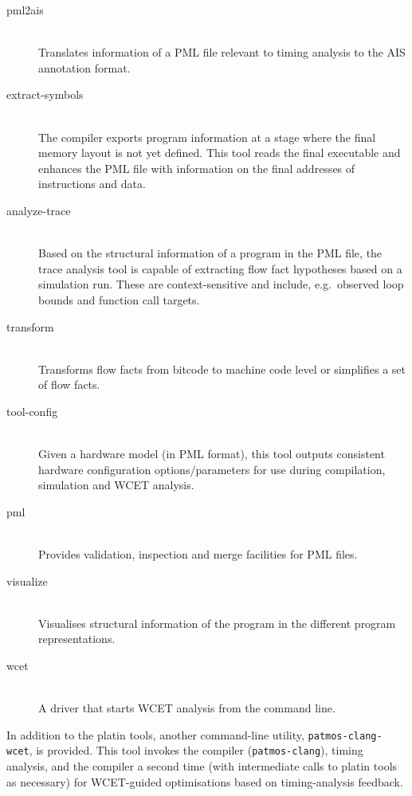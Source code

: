 \begin{description}

  \item[pml2ais] \hfill\\
    Translates information of a PML file relevant to timing analysis to
    the AIS annotation format.

  \item[extract-symbols] \hfill\\
    The compiler exports program information at a stage where the final memory
    layout is not yet defined. This tool reads the final executable and
    enhances the PML file with information on the final addresses of
    instructions and data.

  \item[analyze-trace] \hfill\\
    Based on the structural information of a program in the PML file,
    the trace analysis tool is capable of extracting flow fact hypotheses
    based on a simulation run. These are context-sensitive and include,
    e.g.\ observed loop bounds and function call targets.

  \item[transform] \hfill\\
    Transforms flow facts from bitcode to machine code level
    or simplifies a set of flow facts.

  \item[tool-config] \hfill\\
    Given a hardware model (in PML format), this tool outputs consistent
    hardware configuration options/parameters for use during compilation,
    simulation and WCET analysis.

  \item[pml] \hfill\\
    Provides validation, inspection and merge facilities for PML files.

  \item[visualize] \hfill\\
    Visualises structural information of the program in the different program
    representations.

  \item[wcet] \hfill\\
    A driver that starts WCET analysis from the command line.

\end{description}


In addition to the platin tools, another command-line utility,
\texttt{patmos-clang-wcet}, is provided. This tool invokes the compiler
(\texttt{patmos-clang}), timing analysis, and the compiler a second time
(with intermediate calls to platin tools as necessary) for WCET-guided
optimisations based on timing-analysis feedback.



